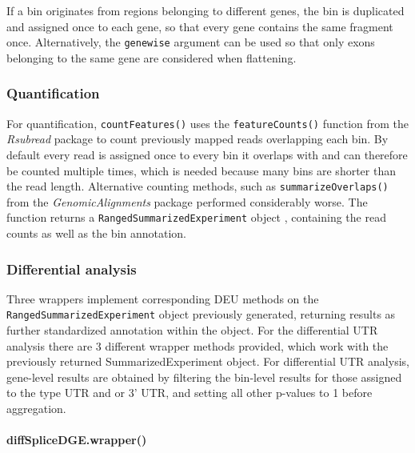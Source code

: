 \documentclass{bmcart}
\begin{document}
If a bin originates from regions belonging to different genes, the bin is duplicated and assigned once to each gene, so that every gene contains the same fragment once. Alternatively, the \texttt{genewise} argument can be used so that only exons belonging to the same gene are considered when flattening.

\subsubsection{Quantification}

For quantification, \texttt{countFeatures()} uses the \texttt{featureCounts()} function from the \textit{Rsubread} package \cite{Liao2014FeatureCounts:Features} to count previously mapped reads overlapping each bin. By default every read is assigned once to every bin it overlaps with and can therefore be counted multiple times, which is needed because many bins are shorter than the read length. Alternative counting methods, such as \texttt{summarizeOverlaps()} from the \textit{GenomicAlignments} package \cite{Lawrence2013SoftwareRanges} performed considerably worse. The function returns a \texttt{RangedSummarizedExperiment} object \cite{Morgan2018SummarizedExperiment:Container}, containing the read counts as well as the bin annotation. 

\subsubsection{Differential analysis}
\label{sec:DE}
Three wrappers implement corresponding DEU methods on the \linebreak \texttt{RangedSummarizedExperiment} object previously generated, returning results as further standardized annotation within the object. For the differential UTR analysis there are 3 different wrapper methods provided, which work with the previously returned SummarizedExperiment object. For differential UTR analysis, gene-level results are obtained by filtering the bin-level results for those assigned to the type UTR and or 3' UTR, and setting all other p-values to 1 before aggregation.

\paragraph{diffSpliceDGE.wrapper()}
\end{document}

